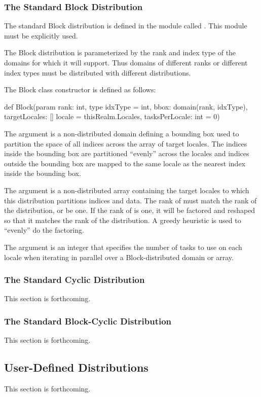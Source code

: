 \subsubsection{The Standard Block Distribution}
\label{Block_Dist}

The standard Block distribution is defined in the module
called .  This module must be explicitly used.

The Block distribution is parameterized by the rank and index type of
the domains for which it will support.  Thus domains of different
ranks or different index types must be distributed with different
distributions.

The Block class constructor is defined as follows:
\begin{chapel}
def Block(param rank: int,
          type idxType = int,
          bbox: domain(rank, idxType),
          targetLocales: [] locale = thisRealm.Locales, 
          tasksPerLocale: int = 0) {
}
\end{chapel}

The argument  is a non-distributed domain defining a
bounding box used to partition the space of all indices across the
array of target locales.  The indices inside the bounding box are
partitioned ``evenly'' across the locales and indices outside the
bounding box are mapped to the same locale as the nearest index inside
the bounding box.

The argument  is a non-distributed array
containing the target locales to which this distribution partitions
indices and data.  The rank of  must match the
rank of the distribution, or be one.  If the rank
of  is one, it will be factored and reshaped so
that it matches the rank of the distribution.  A greedy heuristic is
used to ``evenly'' do the factoring.

The argument  is an integer that specifies the
number of tasks to use on each locale when iterating in parallel over
a Block-distributed domain or array.

\subsubsection{The Standard Cyclic Distribution}
\label{Cyclic_Dist}

This section is forthcoming.

\subsubsection{The Standard Block-Cyclic Distribution}
\label{Block_Cyclic_Dist}

This section is forthcoming.

\subsection{User-Defined Distributions}
\label{User_Defined_Distributions}

This section is forthcoming.
